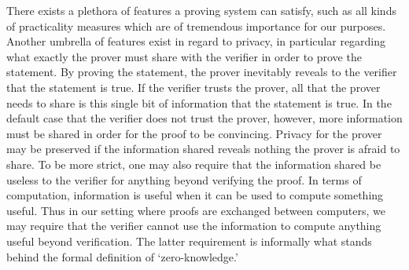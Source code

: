 There exists a plethora of features a proving system can satisfy, such as all kinds of practicality measures which are of tremendous importance for our purposes.
Another umbrella of features exist in regard to privacy, in particular regarding what exactly the prover must share with the verifier in order to prove the statement.
By proving the statement, the prover inevitably reveals to the verifier that the statement is true. 
If the verifier trusts the prover, all that the prover needs to share is this single bit of information that the statement is true.
In the default case that the verifier does not trust the prover, however, more information must be shared in order for the proof to be convincing.
Privacy for the prover may be preserved if the information shared reveals nothing the prover is afraid to share. 
To be more strict, one may also require that the information shared be useless to the verifier for anything beyond verifying the proof.
In terms of computation, information is useful when it can be used to compute something useful.
Thus in our setting where proofs are exchanged between computers, we may require that the verifier cannot use the information to compute anything useful beyond verification.
The latter requirement is informally what stands behind the formal definition of `zero-knowledge.' 

